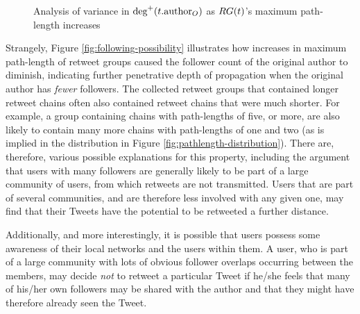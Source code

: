 \begin{figure}[h]
\centering
    \caption{Analysis of variance in $\textrm{deg}^+(t.\textrm{author}_O)$ as $RG(t)$'s maximum path-length increases}
\label{fig:originalfollowers-pathlength}
\end{figure}



Strangely, Figure \ref{fig:following-possibility} illustrates how increases in maximum path-length of retweet groups caused the follower count of the original author to diminish, indicating further penetrative depth of propagation when the original author has \textit{fewer} followers. The collected retweet groups that contained longer retweet chains often also contained retweet chains that were much shorter. For example, a group containing chains with path-lengths of five, or more, are also likely to contain many more chains with path-lengths of one and two (as is implied in the distribution in Figure \ref{fig:pathlength-distribution}). There are, therefore, various possible explanations for this property, including the argument that users with many followers are generally likely to be part of a large community of users, from which retweets are not transmitted. Users that are part of several communities, and are therefore less involved with any given one, may find that their Tweets have the potential to be retweeted a further distance.

Additionally, and more interestingly, it is possible that users possess some awareness of their local networks and the users within them. A user, who is part of a large community with lots of obvious follower overlaps occurring between the members, may decide \textit{not} to retweet a particular Tweet if he/she feels that many of his/her own followers may be shared with the author and that they might have therefore already seen the Tweet.

